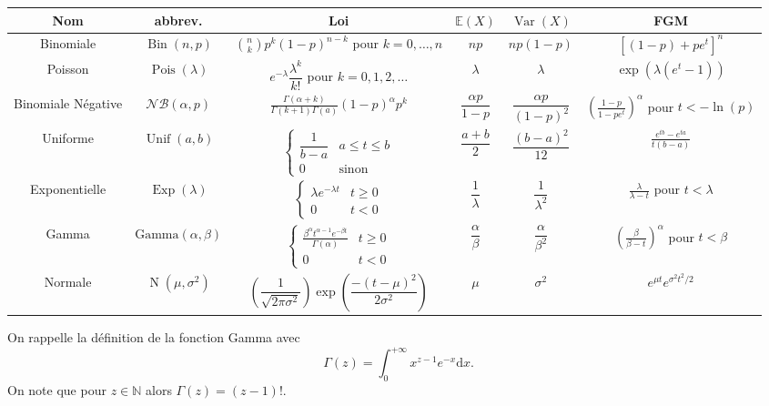\documentclass[11pt, addpoints, answers]{exam}
\def\Bin{\operatorname{Bin}}
\def\Var{\operatorname{Var}}
\def\Pois{\operatorname{Pois}}
\def\Exp{\operatorname{Exp}}
\def\Unif{\operatorname{Unif}}
\def\No{\operatorname{N}}
\newcommand{\E}{\mathbb E}            %
\def\Var{\operatorname{Var}}
\begin{document}
\renewcommand\arraystretch{3.5}
\begin{table}[H]
\begin{center}
\footnotesize
\begin{tabular}{|c|c|c|c|c|c|}

\hline
Nom & abbrev. & Loi & $\E(X)$ & $\Var(X)$ & FGM\\
\hline\hline
Binomiale & $\Bin(n,p)$ & $\binom{n}{k}p^k(1-p)^{n-k}$ pour $k = 0,\ldots,n$ & $np$ & $np(1-p)$ & $[(1-p)+pe^t]^n$\\
\hline
Poisson & $\Pois(\lambda)$ & $e^{-\lambda}\dfrac{\lambda^k}{k!}$ pour $k = 0,1,2,\ldots$ & $\lambda$ & $\lambda$ &$ \exp(\lambda(e^t-1))$\\
\hline
Binomiale Négative & $\mathcal{NB}(\alpha, p)$ & $\frac{\Gamma(\alpha+k)}{\Gamma(k+1)\Gamma(a)}(1-p)^{\alpha}p^k$ & $\dfrac{\alpha p }{1-p}$ & $\dfrac{\alpha p }{(1-p)^2}$ & $\left(\frac{1-p}{1-pe^t}\right)^\alpha$ pour  $t<-\ln(p)$\\
\hline
Uniforme & $\Unif(a,b)$ & $\begin{cases} \dfrac{1}{b-a} & a\leq t\leq b\\ 0 & \text{sinon}\end{cases}
$ & $\dfrac{a+b}{2}$ & $\dfrac{(b-a)^2}{12}$ & $\frac{e^{tb}-e^{ta}}{t(b-a)}$\\
\hline
Exponentielle & $\Exp(\lambda)$ & $\begin{cases} \lambda e^{-\lambda t} & t\geq 0 \\ 0 & t<0\end{cases}$ & $\dfrac{1}{\lambda}$ & $\dfrac{1}{\lambda^2}$ & $\frac{\lambda}{\lambda -t}$ pour $t<\lambda$\\
\hline
Gamma & $\text{Gamma}(\alpha,\beta)$ & $\begin{cases} \frac{\beta^\alpha t^{\alpha-1} e^{-\beta t}}{\Gamma(\alpha)} & t\geq 0 \\ 0 & t<0\end{cases}$ & $\dfrac{\alpha}{\beta}$ & $\dfrac{\alpha}{\beta^2}$ & $\left(\frac{\beta}{\beta -t}\right)^\alpha$ pour $t<\beta$\\
\hline
Normale & $\No(\mu,\sigma^2)$ & $\left(\dfrac{1}{\sqrt{2\pi\sigma^2}}\right)\operatorname{exp}{\left(\dfrac{-(t-\mu)^2}{2\sigma^2}\right)}$ & $\mu$ & $\sigma^2$ & $e^{\mu t}e^{\sigma^2t^2/2}$\\
\hline
\end{tabular}
\end{center}
\end{table}%
On rappelle la définition de la fonction Gamma avec 
$$
\Gamma(z) = \int_{0}^{+\infty}x^{z-1}e^{-x}\text{d}x.
$$
On note que pour $z\in \mathbb{N}$ alors $\Gamma(z) = (z-1)!$.
\end{document}
